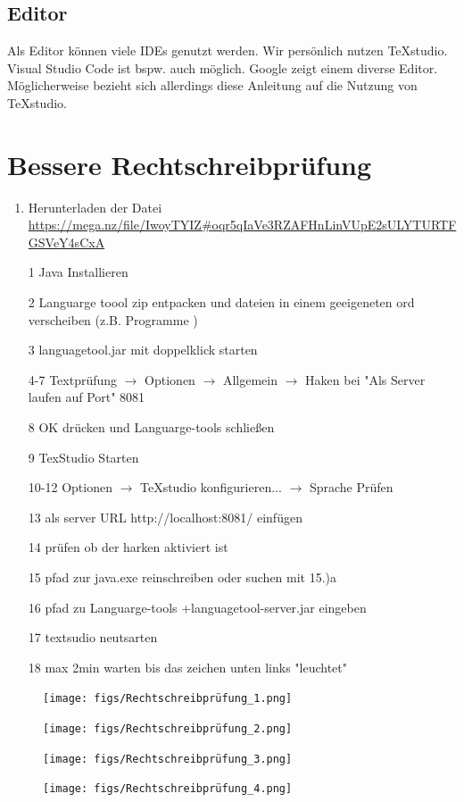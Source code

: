 	\subsection{Editor}
	Als Editor können viele IDEs genutzt werden. Wir persönlich nutzen TeXstudio. Visual Studio Code ist bspw. auch möglich. Google zeigt einem diverse Editor. Möglicherweise bezieht sich allerdings diese Anleitung auf die Nutzung von TeXstudio. 
	
	
	
	\newpage
	\section{Bessere Rechtschreibprüfung}
	\begin{enumerate}
		\item Herunterladen der Datei \url{https://mega.nz/file/IwoyTYIZ#oqr5qIaVe3RZAFHnLinVUpE2sULYTURTFGSVeY4sCxA}\newline
		\item[1] Java Installieren
		\item[2] Languarge toool zip entpacken und dateien in einem geeigeneten ord verscheiben (z.B. Programme )
		\item[3] languagetool.jar mit doppelklick starten
		\item[4-7] Textprüfung $\rightarrow$ Optionen $\rightarrow$ Allgemein $\rightarrow$ Haken bei "Als Server laufen auf Port" 8081
		\item[8] OK drücken und Languarge-tools schließen
		\item[9] TexStudio Starten
		\item[10-12] Optionen $\rightarrow$ TeXstudio konfigurieren... $\rightarrow$ Sprache Prüfen
		\item[13] als server URL http://localhost:8081/ einfügen
		\item[14] prüfen ob der harken aktiviert ist
		\item[15] pfad zur java.exe  reinschreiben oder suchen mit 15.)a
		\item[16] pfad zu Languarge-tools +languagetool-server.jar eingeben
		\item[17] textsudio neutsarten
		\item[18] max 2min warten bis das zeichen unten links "leuchtet"
	\end{enumerate}
	\begin{figure}[H]
		\centering
		\texttt{[image: figs/Rechtschreibprüfung\_1.png]}
		\caption{}
		\label{fig:rechtschreibprufung1}
	\end{figure}
	\begin{figure}[H]
		\centering
		\texttt{[image: figs/Rechtschreibprüfung\_2.png]}
		\caption{}
		\label{fig:rechtschreibprufung2}
	\end{figure}
	\begin{figure}[H]
		\centering
		\texttt{[image: figs/Rechtschreibprüfung\_3.png]}
		\caption{}
		\label{fig:rechtschreibprufung3}
	\end{figure}
	\begin{figure}[H]
		\centering
		\texttt{[image: figs/Rechtschreibprüfung\_4.png]}
		\caption{}
		\label{fig:rechtschreibprufung4}
	\end{figure}


